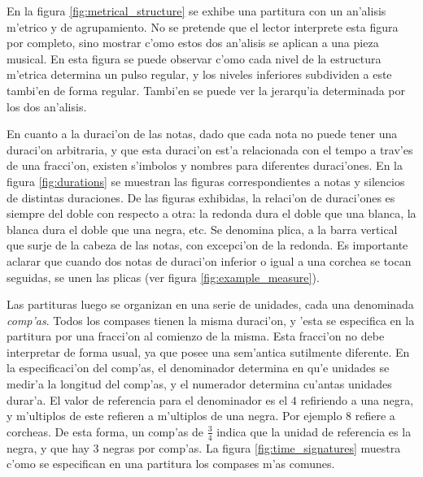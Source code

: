 \begin{imagen}
    \width{10cm}
\end{imagen}

En la figura \ref{fig:metrical_structure} se exhibe una partitura con un an'alisis m'etrico y de agrupamiento. 
No se pretende que el lector interprete esta figura por completo, sino mostrar c'omo estos dos an'alisis se aplican a una pieza musical. 
En esta figura se puede observar c'omo cada nivel de la estructura m'etrica determina un pulso regular, 
y los niveles inferiores subdividen a este tambi'en de forma regular. Tambi'en se puede ver la jerarqu'ia determinada por los dos an'alisis.


En cuanto a la duraci'on de las notas, dado que cada nota no puede tener una duraci'on arbitraria, y que esta duraci'on est'a relacionada con el tempo
a trav'es de una fracci'on, existen s'imbolos y nombres para diferentes duraci'ones. 
En la figura \ref{fig:durations} se muestran las figuras correspondientes a notas y silencios de distintas duraciones. De las figuras exhibidas, la relaci'on de duraci'ones
es siempre del doble con respecto a otra: la redonda dura el doble que una blanca, la blanca dura el doble que una negra, etc. 
Se denomina plica, a la barra vertical que surje 
de la cabeza de las notas, con excepci'on de la redonda. Es importante aclarar que cuando dos notas de duraci'on inferior o igual a una corchea se tocan seguidas, 
se unen las plicas (ver figura \ref{fig:example_measure}).

\begin{imagen}
    \width{10cm}
\end{imagen}

Las partituras luego se organizan en una serie de unidades, cada una denominada \emph{comp'as}. Todos los compases tienen la misma duraci'on, y 'esta se especifica
en la partitura por una fracci'on al comienzo de la misma. Esta fracci'on no debe interpretar de forma usual, ya que posee una sem'antica sutilmente diferente.
En la especificaci'on del comp'as, el denominador determina en qu'e unidades se medir'a la longitud del comp'as, y el numerador determina cu'antas unidades 
durar'a. El valor de referencia para el denominador es el $4$ refiriendo a una negra, y m'ultiplos de este refieren a m'ultiplos de una negra. Por ejemplo
$8$ refiere a corcheas.  De esta forma, un comp'as de $\frac{3}{4}$ indica que la unidad de referencia es la negra, y que hay $3$ negras por comp'as.
La figura \ref{fig:time_signatures} muestra c'omo se especifican en una partitura los compases m'as comunes.

